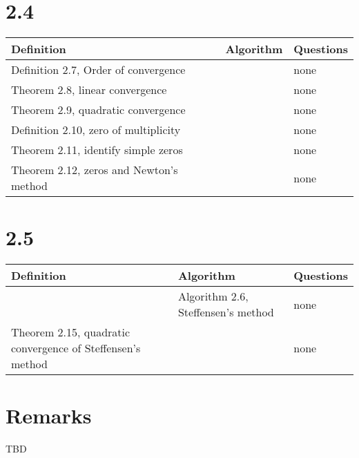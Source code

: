 \documentclass{article}
\begin{document}
\section*{2.4}

\begin{tabularx}{\textwidth}{ |X|X|X| }
    \hline
	{\bf Definition} & {\bf Algorithm} & {\bf Questions} \\
    \hline
	Definition 2.7, Order of convergence & & none \\
    \hline
	Theorem 2.8, linear convergence & & none \\
    \hline
	Theorem 2.9, quadratic convergence & & none \\
    \hline
	Definition 2.10, zero of multiplicity & & none \\
    \hline
	Theorem 2.11, identify simple zeros & & none \\
    \hline
	Theorem 2.12, zeros and Newton's method & & none \\
    \hline
\end{tabularx}

\section*{2.5}

\begin{tabularx}{\textwidth}{ |X|X|X| }
    \hline
	{\bf Definition} & {\bf Algorithm} & {\bf Questions} \\
    \hline
	 & Algorithm 2.6, Steffensen's method & none \\
    \hline
	Theorem 2.15, quadratic convergence of Steffensen's method & & none \\
    \hline
\end{tabularx}

\section*{Remarks}

TBD
\end{document}
